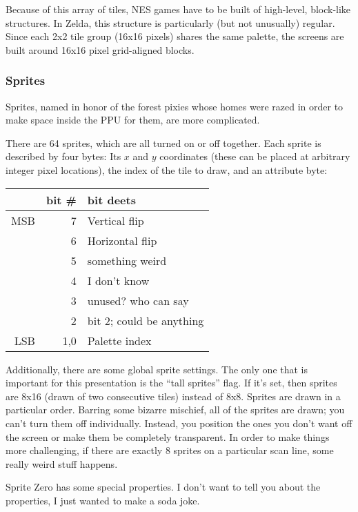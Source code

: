 \documentclass[twocolumn]{article}
\begin{document}
Because of this array of tiles, NES games have to be built of
high-level, block-like structures. In Zelda, this structure is
particularly (but not unusually) regular. Since each 2x2 tile group
(16x16 pixels) shares the same palette, the screens are built around
16x16 pixel grid-aligned blocks.

\subsubsection{Sprites} \label{sec:sprites}

Sprites, named in honor of the forest pixies whose homes were razed in
order to make space inside the PPU for them, are more complicated.

There are 64 sprites, which are all turned on or off together. Each
sprite is described by four bytes: Its $x$ and $y$ coordinates (these
can be placed at arbitrary integer pixel locations), the index of
the tile to draw, and an attribute byte:

\begin{tabular}{rrl}
    & bit \# & bit deets \\
\hline
MSB & 7      & Vertical flip \\
    & 6      & Horizontal flip \\
    & 5      & something weird \\
    & 4      & I don't know \\
    & 3      & unused? who can say \\
    & 2      & bit 2; could be anything \\
LSB & 1,0    & Palette index \\
\end{tabular}

Additionally, there are some global sprite settings. The only one that
is important for this presentation is the ``tall sprites'' flag. If
it's set, then sprites are 8x16 (drawn of two consecutive tiles)
instead of 8x8. Sprites are drawn in a particular order. Barring some
bizarre mischief, all of the sprites are drawn; you can't turn them
off individually. Instead, you position the ones you don't want off
the screen or make them be completely transparent. In order to make
things more challenging, if there are exactly 8 sprites on a
particular scan line, some really weird stuff happens. %

Sprite Zero has some special properties. I don't want to tell you
about the properties, I just wanted to make a soda joke.
\end{document}
